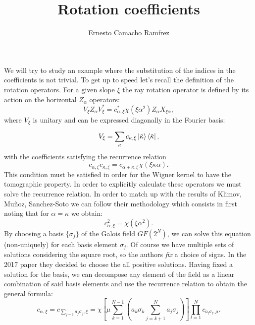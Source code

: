 \documentclass[a4paper]{article}
\title{Rotation coefficients}
\author{Ernesto Camacho Ramírez}
\begin{document}
  \maketitle

  We will try to study an example where the substitution of
  the indices in the coefficients is not trivial. To get up
  to speed let's recall the definition of the rotation
  operators. For a given slope $\xi$ the ray rotation
  operator is defined by its action on the horizontal
  $Z_\alpha$ operators:
  \begin{equation}
    V_\xi Z_\alpha V_\xi^{*}
    = c_{\alpha,\xi}^* \chi(\xi \alpha^2) Z_\alpha
    X_{\xi\alpha},
  \end{equation}
  where $V_\xi$ is unitary and can be expressed diagonally
  in the Fourier basis:
  \begin{equation}
    V_\xi
    = \sum_{\kappa}^{} c_{\kappa,\xi} \ket{\tilde\kappa}
    \bra{\tilde\kappa},
  \end{equation}
  with the coefficients satisfying the recurrence relation
  \begin{equation}
    c_{\alpha,\xi} c_{\kappa,\xi}
    = c_{\alpha+\kappa,\xi} \chi(\xi\kappa\alpha).
  \end{equation}
  This condition must be satisfied in order for the Wigner
  kernel to have the tomographic property. In order to
  explícitly calculate these operators we must solve the
  recurrence relation. In order to match up with the results
  of Klimov, Muñoz, Sanchez-Soto we can follow their
  methodology which consists in first noting that for
  $\alpha = \kappa$ we obtain:
  \begin{equation}
    c_{\alpha,\xi}^2 = \chi(\xi\alpha^2).
  \end{equation}
  By choosing a basis $\{\sigma_j\}$ of the Galois field
  $GF(2^N)$, we can solve this equation (non-uniquely) for
  each basis element $\sigma_j$. Of course we have multiple
  sets of solutions considering the square root, so the
  authors \textit{fix} a choice of signs. In the 2017 paper
  they decided to choose the all positive solutions. Having
  fixed a solution for the basis, we can decompose any
  element of the field as a linear combination of said basis
  elements and use the recurrence relation to obtain the
  general formula:
  \begin{equation}
    c_{\alpha,\xi}
    = c_{\sum_{j=1}^{} a_j \sigma_j,\xi}
    = \chi\left[
    \mu \sum_{k=1}^{N-1} \left(
      a_k \sigma_k
      \sum_{j=k+1}^{N} a_j \sigma_j
    \right) \right]
    \prod_{l=1}^N c_{a_l \sigma_l, \mu}.
  \end{equation}
\end{document}
